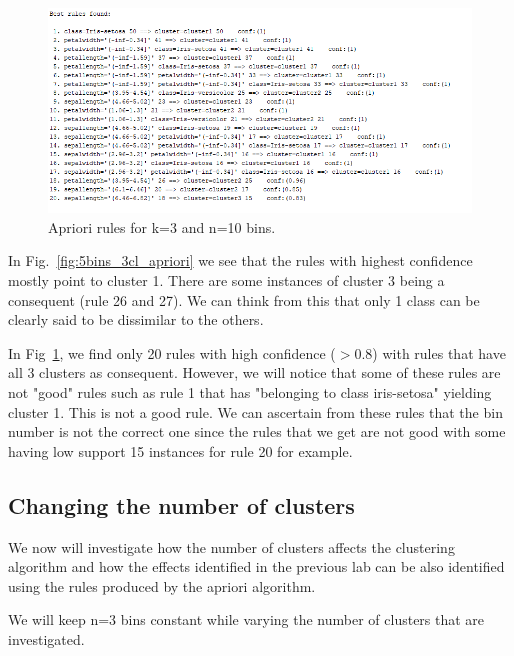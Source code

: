 \documentclass[letterpaper,12pt]{article}
\begin{document}
\begin{figure}[H] 
  \centering
      \includegraphics[width=0.8\columnwidth]{10_bins_3cl_apriori_rules}
        \caption{
                \label{fig:10bins_3cl_apriori}  
                Apriori rules for k=3 and n=10 bins.
        }
\end{figure}

In Fig.~\ref{fig:5bins_3cl_apriori} we see that the rules with highest confidence mostly point to cluster 1. There are some instances of cluster 3 being a consequent (rule 26 and 27). We can think from this that only 1 class can be clearly said to be dissimilar to the others.

In Fig~\ref{fig:10bins_3cl_apriori}, we find only 20 rules with high confidence ($>0.8$) with rules that have all 3 clusters as consequent. However, we will notice that some of these rules are not "good" rules such as rule 1 that has "belonging to class iris-setosa" yielding cluster 1. This is not a good rule. We can ascertain from these rules that the bin number is not the correct one since the rules that we get are not good with some having low support 15 instances for rule 20 for example. 

\subsection{Changing the number of clusters}

We now will investigate how the number of clusters affects the clustering algorithm and how the effects identified in the previous lab can be also identified using the rules produced by the apriori algorithm.

We will keep n=3 bins constant while varying the number of clusters that are investigated.
\end{document}
